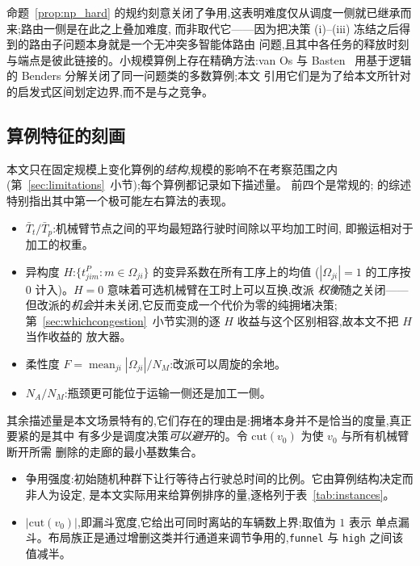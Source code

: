 \documentclass[manuscript,screen,review]{acmart}
\begin{document}
命题~\ref{prop:np_hard} 的规约刻意关闭了争用,这表明难度仅从调度一侧就已继承而来;路由一侧是在此之上叠加难度,
而非取代它——因为把决策 (i)--(iii) 冻结之后得到的路由子问题本身就是一个无冲突多智能体路由
问题,且其中各任务的释放时刻与端点是彼此链接的。小规模算例上存在精确方法:van Os 与
Basten~\cite{vanos2026exact} 用基于逻辑的 Benders 分解关闭了同一问题类的多数算例;本文
引用它们是为了给本文所针对的启发式区间划定边界,而不是与之竞争。

\subsection{算例特征的刻画}
\label{sec:features}

本文只在固定规模上变化算例的\emph{结构},规模的影响不在考察范围之内
(第~\ref{sec:limitations}~小节);每个算例都记录如下描述量。
前四个是常规的;\cite{xin2025review} 的综述特别指出其中第一个极可能左右算法的表现。

\begin{itemize}[leftmargin=*,topsep=2pt,itemsep=1pt]
\item $\bar{T}_t/\bar{T}_p$:机械臂节点之间的平均最短路行驶时间除以平均加工时间,
即搬运相对于加工的权重。
\item 异构度 $H$:$\{t^P_{jim}: m\in\Omega_{ji}\}$ 的变异系数在所有工序上的均值
($|\Omega_{ji}|=1$ 的工序按 $0$ 计入)。$H=0$ 意味着可选机械臂在工时上可以互换,改派
\emph{权衡}随之关闭——但改派的\emph{机会}并未关闭,它反而变成一个代价为零的纯拥堵决策;
第~\ref{sec:whichcongestion}~小节实测的逐 $H$ 收益与这个区别相容,故本文不把 $H$ 当作收益的
放大器。
\item 柔性度 $F=\operatorname{mean}_{ji}|\Omega_{ji}|/N_M$:改派可以周旋的余地。
\item $N_A/N_M$:瓶颈更可能位于运输一侧还是加工一侧。
\end{itemize}

其余描述量是本文场景特有的,它们存在的理由是:拥堵本身并不是恰当的度量,真正要紧的是其中
有多少是调度决策\emph{可以避开}的。令 $\mathrm{cut}(v_0)$ 为使 $v_0$ 与所有机械臂断开所需
删除的走廊的最小基数集合。

\begin{itemize}[leftmargin=*,topsep=2pt,itemsep=1pt]
\item 争用强度:初始随机种群下让行等待占行驶总时间的比例。它由算例结构决定而非人为设定,
是本文实际用来给算例排序的量,逐格列于表~\ref{tab:instances}。
\item $|\mathrm{cut}(v_0)|$,即漏斗宽度,它给出可同时离站的车辆数上界;取值为 $1$ 表示
单点漏斗。布局族正是通过增删这类并行通道来调节争用的,\texttt{funnel} 与 \texttt{high}
之间该值减半。
\end{itemize}
\end{document}
